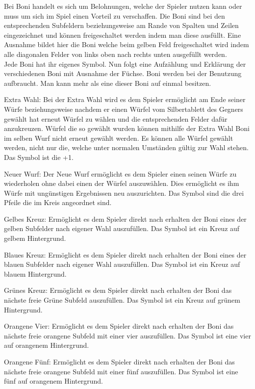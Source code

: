 Bei Boni handelt es sich um Belohnungen, welche der Spieler nutzen kann oder muss um sich im Spiel einen Vorteil zu verschaffen. Die Boni sind bei den entsprechenden Subfeldern beziehungsweise am Rande von Spalten und Zeilen eingezeichnet und können freigeschaltet werden indem man diese ausfüllt. Eine Ausnahme bildet hier die Boni welche beim gelben Feld freigeschaltet wird indem alle diagonalen Felder von links oben nach rechts unten ausgefüllt werden. \\

Jede Boni hat ihr eigenes Symbol. Nun folgt eine Aufzählung und Erklärung der verschiedenen Boni mit Ausnahme der Füchse. Boni werden bei der Benutzung aufbraucht. Man kann mehr als eine dieser Boni auf einmal besitzen.

Extra Wahl: Bei der Extra Wahl wird es dem Spieler ermöglicht am Ende seiner Würfe beziehungsweise nachdem er einen Würfel vom Silbertablett des Gegners gewählt hat erneut Würfel zu wählen und die entsprechenden Felder dafür anzukreuzen. Würfel die so gewählt wurden können mithilfe der Extra Wahl Boni im selben Wurf nicht erneut gewählt werden. Es können alle Würfel gewählt werden, nicht nur die, welche unter normalen Umständen gültig zur Wahl stehen. Das Symbol ist die +1.

Neuer Wurf: Der Neue Wurf ermöglicht es dem Spieler einen seinen Würfe zu wiederholen ohne dabei einen der Würfel auszuwählen. Dies ermöglicht es ihm Würfe mit ungünstigen Ergebnissen neu auszurichten. Das Symbol sind die drei Pfeile die im Kreis angeordnet sind.

Gelbes Kreuz: Ermöglicht es dem Spieler direkt nach erhalten der Boni eines der gelben Subfelder nach eigener Wahl auszufüllen. Das Symbol ist ein Kreuz auf gelbem Hintergrund.

Blaues Kreuz: Ermöglicht es dem Spieler direkt nach erhalten der Boni eines der blauen Subfelder nach eigener Wahl auszufüllen. Das Symbol ist ein Kreuz auf blauem Hintergrund.

Grünes Kreuz: Ermöglicht es dem Spieler direkt nach erhalten der Boni das nächste freie Grüne Subfeld auszufüllen. Das Symbol ist ein Kreuz auf grünem Hintergrund.

Orangene Vier: Ermöglicht es dem Spieler direkt nach erhalten der Boni das nächste freie orangene Subfeld mit einer vier auszufüllen. Das Symbol ist eine vier auf orangenem Hintergrund.

Orangene Fünf: Ermöglicht es dem Spieler direkt nach erhalten der Boni das nächste freie orangene Subfeld mit einer fünf auszufüllen. Das Symbol ist eine fünf auf orangenem Hintergrund.

